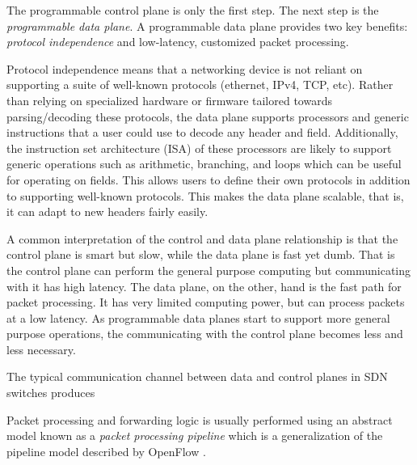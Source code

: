 The programmable control plane is only the first step. The next
step is the \emph{programmable data plane}. A programmable data plane provides
two key benefits: \emph{protocol independence} and low-latency, customized packet
processing.

Protocol independence means that a networking device is not reliant on supporting
a suite of well-known protocols (ethernet, IPv4, TCP, etc).
Rather than relying on specialized hardware or firmware tailored towards parsing/decoding
these protocols, the data plane supports processors
and generic instructions that a user could use to decode any header and field.
Additionally, the instruction set architecture (ISA) of these processors
are likely to support generic operations such as arithmetic, branching, and loops
which can be useful for operating on fields.
This allows users to define their own protocols in addition to
supporting well-known protocols. This makes the data plane scalable, that is, it
can adapt to new headers fairly easily.

A common interpretation of the control and data plane relationship is that the
control plane is smart but slow, while the data plane is fast yet dumb. That is
the control plane can perform the general purpose computing but communicating with
it has high latency. The data plane, on the other, hand is the fast path for packet processing.
It has very limited computing power, but can process packets at a low latency.
As programmable data planes start to support more general purpose operations,
the communicating with the control plane becomes less and less necessary.


The typical communication channel between data and control planes in SDN switches
produces

Packet processing and forwarding logic is usually performed using an abstract
model known as a \emph{packet processing pipeline} which is a generalization of
the pipeline model described by OpenFlow \cite{openflow_spec}.



%
%

